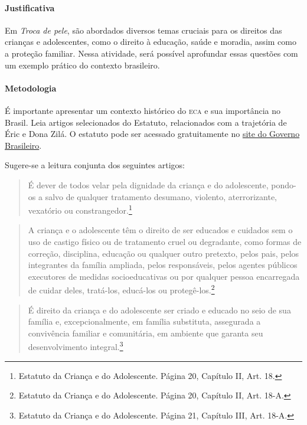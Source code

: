 \documentclass[11pt]{extarticle}
\begin{document}
\paragraph{Justificativa} Em \textit{Troca de pele}, são abordados diversos temas cruciais para os direitos das crianças e adolescentes, como o direito à educação, saúde e moradia, assim como a proteção familiar. Nessa atividade, será possível aprofundar essas questões com um exemplo prático do contexto brasileiro.

\paragraph{Metodologia} É importante apresentar um contexto histórico do \textsc{eca} e sua importância no Brasil. Leia artigos selecionados do Estatuto, relacionados com a trajetória de Éric e Dona Zilá. O estatuto pode ser acessado gratuitamente no \href{https://www.gov.br/mdh/pt-br/assuntos/noticias/2021/julho/trinta-e-um-anos-do-estatuto-da-crianca-e-do-adolescente-confira-as-novas-acoes-para-fortalecer-o-eca/ECA2021_Digital.pdf}{site do Governo Brasileiro}. 


Sugere-se a leitura conjunta dos seguintes artigos:

\begin{quote}É dever de todos velar pela dignidade da criança e do adolescente, pondo-os a salvo de qualquer tratamento desumano,
violento, aterrorizante, vexatório ou constrangedor.\footnote{Estatuto da Criança e do Adolescente. Página 20, Capítulo II, Art. 18.}\end{quote} 

\begin{quote}A criança e o adolescente têm o direito de ser educados e cuidados sem o uso de castigo físico ou de tratamento cruel ou degradante, como formas de correção, disciplina, educação ou qualquer outro pretexto, pelos pais, pelos integrantes da família
ampliada, pelos responsáveis, pelos agentes públicos executores de medidas socioeducativas ou por qualquer pessoa encarregada
de cuidar deles, tratá-los, educá-los ou protegê-los.\footnote{Estatuto da Criança e do Adolescente. Página 20, Capítulo II, Art. 18-A.}\end{quote} 

\begin{quote}É direito da criança e do adolescente ser criado e educado no seio de sua família e, excepcionalmente, em família substituta, assegurada a convivência familiar e comunitária, em ambiente que garanta seu desenvolvimento integral.\footnote{Estatuto da Criança e do Adolescente. Página 21, Capítulo III, Art. 18-A.}\end{quote} 
\end{document}
